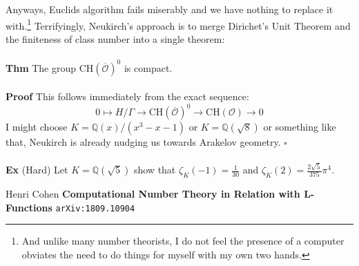 \documentclass[12pt]{article}
\begin{document}
\newpage

\noindent Anyways, Euclids algorithm fails miserably and we have nothing to replace it with.\footnote{And unlike many number theorists, I do not feel the presence of a computer obviates the need to do things for myself with my own two hands.} Terrifyingly, Neukirch's approach is to merge Dirichet's Unit Theorem and the finiteness of class number into a single theorem:\\ \\
\textbf{Thm} The group $\text{CH}(\overline{\mathcal{O}})^0$ is compact. \\ \\
\textbf{Proof} This follows immediately from the exact sequence:
$$ 0 \mapsto H/\Gamma \to \text{CH}(\overline{\mathcal{O}})^0 \to \text{CH}(\mathcal{O}) \to 0 $$
I might choose $K = \mathbb{Q}(x)/(x^3 - x - 1)$ or $K = \mathbb{Q}(\sqrt{8})$ or something like that, Neukirch is already nudging us towards Arakelov geometry. \hfill $\square$\\ \\
\textbf{Ex} (Hard) Let $K = \mathbb{Q}(\sqrt{5})$ show that $\zeta_K(-1) = \frac{1}{30}$ and $\zeta_K(2) =\frac{2\sqrt{5}}{375} \pi^4 $.

\vfill
\begin{thebibliography}{}

\item Henri Cohen \textbf{Computational Number Theory in Relation with L-Functions} \texttt{arXiv:1809.10904}

\end{thebibliography}
\end{document}
